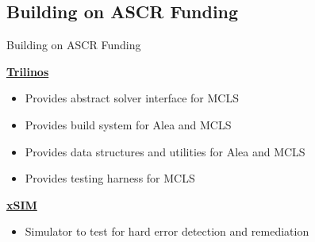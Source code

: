 \documentclass{beamer}
\begin{document}
\subsection{Building on ASCR Funding}

\begin{frame}{Building on ASCR Funding}

  \underline{\bf Trilinos}
  \begin{itemize}
  \item Provides abstract solver interface for MCLS
  \item Provides build system for Alea and MCLS
  \item Provides data structures and utilities for Alea and MCLS
  \item Provides testing harness for MCLS
  \end{itemize}

  \vfill

  \underline{\bf xSIM}
  \begin{itemize}
  \item Simulator to test for hard error detection and remediation
  \end{itemize}

\end{frame}

\end{document}
